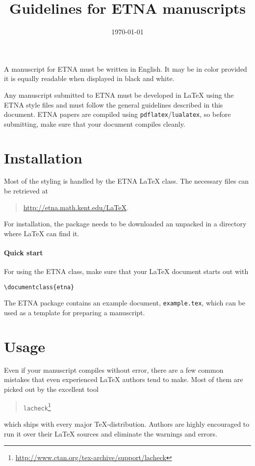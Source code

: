 \documentclass[parskip=half]{scrartcl}
\title{Guidelines for ETNA manuscripts}
\date{\today}
\begin{document}
\maketitle


A manuscript for ETNA must be written in English. It may be in color provided
it is equally readable when displayed in black and white.

Any manuscript submitted to ETNA must be developed in \LaTeX{} using the ETNA
style files and must follow the general guidelines described in this document.
ETNA papers are compiled using \texttt{pdflatex}/\texttt{lualatex}, so before
submitting, make sure that your document compiles cleanly.

\section{Installation}

Most of the styling is handled by the ETNA \LaTeX{} class. The necessary files
can be retrieved at
\begin{quote}
\url{http://etna.math.kent.edu/LaTeX}.
\end{quote}
For installation, the package needs to be downloaded an unpacked in a directory
where \LaTeX{} can find it.

\paragraph{Quick start}
For using the ETNA class, make sure that your \LaTeX{} document starts out with
\begin{verbatim}
\documentclass{etna}
\end{verbatim}
The ETNA package contains an example document,
\texttt{example.tex}, which can be used as a template for preparing a
manuscript.

\section{Usage}

Even if your manuscript compiles without error, there are a few common mistakes
that even experienced \LaTeX{} authors tend to make. Most of them are picked
out by the excellent tool
\begin{quote}
  \verb|lacheck|\footnote{\url{http://www.ctan.org/tex-archive/support/lacheck}}
\end{quote}
which ships with every major \TeX{}-distribution.
Authors are highly encouraged to run it over their \LaTeX{} sources and
eliminate the warnings and errors.
\end{document}
